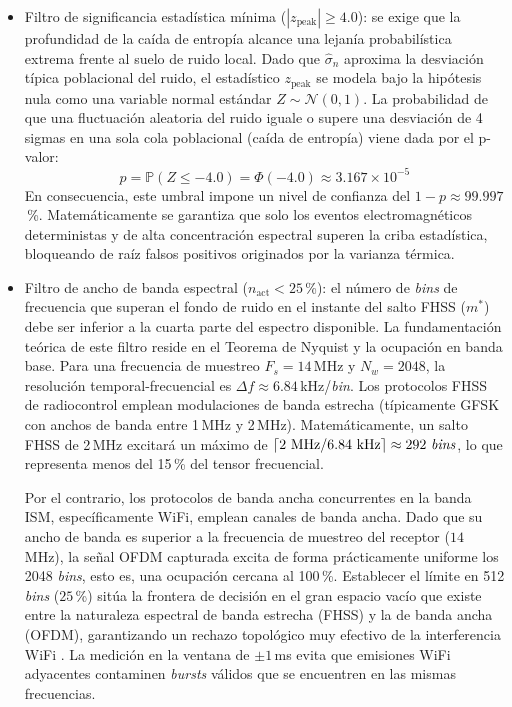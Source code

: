 \begin{itemize}\itemsep 0em
    \item Filtro de significancia estadística mínima ($|z_{\text{peak}}| \ge 4.0$): se exige que la profundidad de la caída de entropía alcance una lejanía probabilística extrema frente al suelo de ruido local. Dado que $\hat{\sigma}_n$ aproxima la desviación típica poblacional del ruido, el estadístico $z_{\text{peak}}$ se modela bajo la hipótesis nula como una variable normal estándar $Z \sim \mathcal{N}(0, 1)$. La probabilidad de que una fluctuación aleatoria del ruido iguale o supere una desviación de 4 sigmas en una sola cola poblacional (caída de entropía) viene dada por el p-valor:
    \begin{equation}
        p = \mathbb{P}(Z \le -4.0) = \Phi(-4.0) \approx 3.167 \times 10^{-5}
    \end{equation}
    En consecuencia, este umbral impone un nivel de confianza del $1 - p \approx 99.997$\,\%. Matemáticamente se garantiza que solo los eventos electromagnéticos deterministas y de alta concentración espectral superen la criba estadística, bloqueando de raíz falsos positivos originados por la varianza térmica.

    \item Filtro de ancho de banda espectral ($n_{\text{act}} < 25$\,\%): el número de \textit{bins} de frecuencia que superan el fondo de ruido en el instante del salto FHSS ($m^*$) debe ser inferior a la cuarta parte del espectro disponible. La fundamentación teórica de este filtro reside en el Teorema de Nyquist y la ocupación en banda base. Para una frecuencia de muestreo $F_s = 14$\,MHz y $N_w = 2048$, la resolución temporal-frecuencial es $\Delta f \approx 6.84$\,kHz/\textit{bin}. Los protocolos FHSS de radiocontrol emplean modulaciones de banda estrecha (típicamente GFSK con anchos de banda entre 1\,MHz y 2\,MHz). Matemáticamente, un salto FHSS de 2\,MHz excitará un máximo de $\lceil 2\text{ MHz} / 6.84\text{ kHz} \rceil \approx 292 \text{ \textit{bins}}$, lo que representa menos del 15\,\% del tensor frecuencial.

    Por el contrario, los protocolos de banda ancha concurrentes en la banda ISM, específicamente WiFi, emplean canales de banda ancha. Dado que su ancho de banda es superior a la frecuencia de muestreo del receptor ($14$\,MHz), la señal OFDM capturada excita de forma prácticamente uniforme los 2048 \textit{bins}, esto es, una ocupación cercana al 100\,\%. Establecer el límite en 512 \textit{bins} ($25$\,\%) sitúa la frontera de decisión en el gran espacio vacío que existe entre la naturaleza espectral de banda estrecha (FHSS) y la de banda ancha (OFDM), garantizando un rechazo topológico muy efectivo de la interferencia WiFi \cite{miller_service_2007}. La medición en la ventana de $\pm 1$\,ms evita que emisiones WiFi adyacentes contaminen \textit{bursts} válidos que se encuentren en las mismas frecuencias.
\end{itemize}

